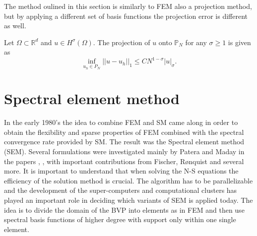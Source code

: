 The method oulined in this section is similarly to FEM also a projection method, 
but by applying a different set of basis functions the projection error is different 
as well. 

\begin{theorem}
    Let $\Omega \subset \mathbb{R}^d$ and  $u \in H^{\sigma}(\Omega)$. The projection 
    of $u$ onto $\mathbb{P}_N$ for any $\sigma \ge 1$ is given as  
    \begin{equation}
        \inf_{u_h\in P_N}||u-u_h||_1 \le CN^{1-\sigma}|u|_{\sigma}.
    \end{equation}
    \label{thm:smconvergence}
\end{theorem}


\section{Spectral element method} \label{sem}
In the early 1980's the idea to combine FEM and SM came along in order to obtain the 
flexibility and sparse properties of FEM 
combined with the spectral convergence rate provided by SM. 
The result was the Spectral element method (SEM). Several formulations were investigated mainly by 
Patera and Maday in the papers \cite{maday1989}, \cite{Patera1984}, \cite{Patera1986} with 
important contributions from Fischer, Rønquist and several more.
It is important to understand that when solving the N-S equations the efficiency of the solution 
method is crucial. The algorithm has to be parallelizable and the development of the
super-computers and computational clusters has played an important role in 
deciding which variants of SEM is applied today. 
The idea is to divide the domain of the BVP into elements as in FEM and then use spectral basis 
functions of higher degree with support only within one single element. 

